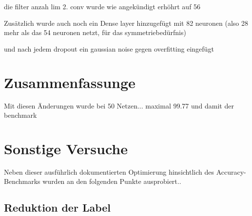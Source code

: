 \documentclass[
fontsize=12pt,					%
paper=a4,						%
twoside=true, 					%
listof=totoc, 					%
bibliography=totoc,				%
titlepage, 						%
headsepline, 					%
DIV=12,							%
BCOR=6mm,						%
cleardoublepage=empty,			%
parskip,							%
ngerman
]{scrartcl}
\begin{document}
die filter anzah lim 2. conv wurde wie angekündigt erhöhrt auf 56


Zusätzlich wurde auch noch ein Dense layer hinzugefügt mit 82 neuronen (also 28 mehr als das 54 neuronen netzt, für das symmetriebedürfnis)

und nach jedem dropout ein gaussian noise gegen overfitting eingefügt


\section{Zusammenfassunge}

Mit diesen Änderungen wurde bei 50 Netzen...
maximal 99.77 und damit der benchmark


\section{Sonstige Versuche}

Neben dieser ausführlich dokumentierten Optimierung hinsichtlich des Accuracy-Benchmarks wurden an den folgenden Punkte ausprobiert.. 

\subsection{Reduktion der Label}
\end{document}
